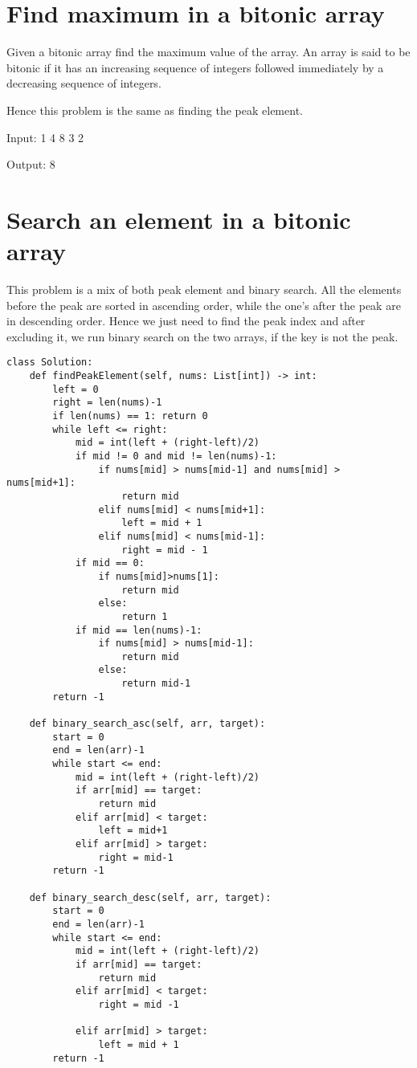 \documentclass[24pt, a4]{article}
\begin{document}
\section{Find maximum in a bitonic array}
Given a bitonic array find the maximum value of the array. An array is said 
to be bitonic if it has an increasing sequence of integers followed 
immediately by a decreasing sequence of integers.

Hence this problem is the same as finding the peak element.

Input:
1 4 8 3 2

Output:
8
\newpage
\section{Search an element in a bitonic array}
This problem is a mix of both peak element and binary search. All the elements
before the peak are sorted in ascending order, while the one's after the peak
are in descending order. Hence we just need to find the peak index and after 
excluding it, we run binary search on the two arrays, if the key is not the 
peak.

\begin{lstlisting}
class Solution:
    def findPeakElement(self, nums: List[int]) -> int:
        left = 0
        right = len(nums)-1
        if len(nums) == 1: return 0
        while left <= right:
            mid = int(left + (right-left)/2)
            if mid != 0 and mid != len(nums)-1:
                if nums[mid] > nums[mid-1] and nums[mid] > nums[mid+1]:
                    return mid
                elif nums[mid] < nums[mid+1]:
                    left = mid + 1
                elif nums[mid] < nums[mid-1]:
                    right = mid - 1
            if mid == 0:
                if nums[mid]>nums[1]:
                    return mid
                else:
                    return 1
            if mid == len(nums)-1:
                if nums[mid] > nums[mid-1]:
                    return mid
                else:
                    return mid-1
        return -1 

    def binary_search_asc(self, arr, target):
        start = 0
        end = len(arr)-1
        while start <= end:
            mid = int(left + (right-left)/2)
            if arr[mid] == target:
                return mid
            elif arr[mid] < target:
                left = mid+1
            elif arr[mid] > target:
                right = mid-1
        return -1

    def binary_search_desc(self, arr, target):
        start = 0
        end = len(arr)-1
        while start <= end:
            mid = int(left + (right-left)/2)
            if arr[mid] == target:
                return mid
            elif arr[mid] < target:
                right = mid -1

            elif arr[mid] > target:
                left = mid + 1
        return -1
\end{lstlisting}
\end{document}
